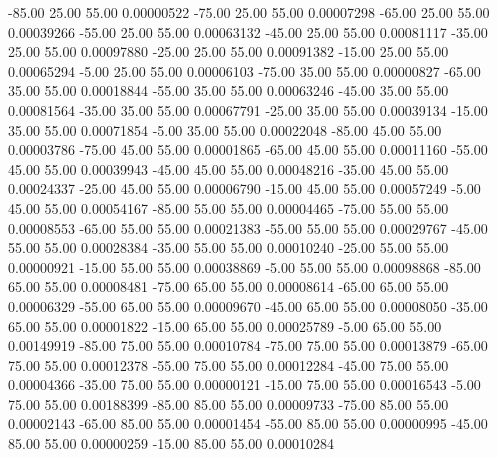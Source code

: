     -85.00     25.00     55.00     0.00000522
    -75.00     25.00     55.00     0.00007298
    -65.00     25.00     55.00     0.00039266
    -55.00     25.00     55.00     0.00063132
    -45.00     25.00     55.00     0.00081117
    -35.00     25.00     55.00     0.00097880
    -25.00     25.00     55.00     0.00091382
    -15.00     25.00     55.00     0.00065294
     -5.00     25.00     55.00     0.00006103
    -75.00     35.00     55.00     0.00000827
    -65.00     35.00     55.00     0.00018844
    -55.00     35.00     55.00     0.00063246
    -45.00     35.00     55.00     0.00081564
    -35.00     35.00     55.00     0.00067791
    -25.00     35.00     55.00     0.00039134
    -15.00     35.00     55.00     0.00071854
     -5.00     35.00     55.00     0.00022048
    -85.00     45.00     55.00     0.00003786
    -75.00     45.00     55.00     0.00001865
    -65.00     45.00     55.00     0.00011160
    -55.00     45.00     55.00     0.00039943
    -45.00     45.00     55.00     0.00048216
    -35.00     45.00     55.00     0.00024337
    -25.00     45.00     55.00     0.00006790
    -15.00     45.00     55.00     0.00057249
     -5.00     45.00     55.00     0.00054167
    -85.00     55.00     55.00     0.00004465
    -75.00     55.00     55.00     0.00008553
    -65.00     55.00     55.00     0.00021383
    -55.00     55.00     55.00     0.00029767
    -45.00     55.00     55.00     0.00028384
    -35.00     55.00     55.00     0.00010240
    -25.00     55.00     55.00     0.00000921
    -15.00     55.00     55.00     0.00038869
     -5.00     55.00     55.00     0.00098868
    -85.00     65.00     55.00     0.00008481
    -75.00     65.00     55.00     0.00008614
    -65.00     65.00     55.00     0.00006329
    -55.00     65.00     55.00     0.00009670
    -45.00     65.00     55.00     0.00008050
    -35.00     65.00     55.00     0.00001822
    -15.00     65.00     55.00     0.00025789
     -5.00     65.00     55.00     0.00149919
    -85.00     75.00     55.00     0.00010784
    -75.00     75.00     55.00     0.00013879
    -65.00     75.00     55.00     0.00012378
    -55.00     75.00     55.00     0.00012284
    -45.00     75.00     55.00     0.00004366
    -35.00     75.00     55.00     0.00000121
    -15.00     75.00     55.00     0.00016543
     -5.00     75.00     55.00     0.00188399
    -85.00     85.00     55.00     0.00009733
    -75.00     85.00     55.00     0.00002143
    -65.00     85.00     55.00     0.00001454
    -55.00     85.00     55.00     0.00000995
    -45.00     85.00     55.00     0.00000259
    -15.00     85.00     55.00     0.00010284
